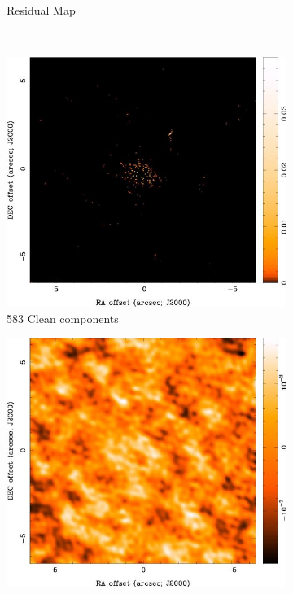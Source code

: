 \begin{figure}
\begin{subfigure}[b]{0.5\textwidth}
                \caption{Residual Map}
                \label{fig:ResMap100}
        \end{subfigure} %
        ~ %
        \begin{subfigure}[b]{0.5\textwidth}
				\centering                
                \includegraphics[scale=0.6]{Figures/uv-coverage/cleanD583map}
                \caption{583 Clean components }
                \label{fig:clmap583}
        \end{subfigure}%
        \begin{subfigure}[b]{0.5\textwidth}
				\centering                
                \includegraphics[scale=0.6]{Figures/uv-coverage/cleanD583res}

\end{subfigure}
\end{figure}
